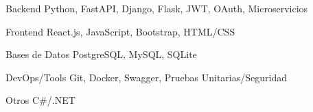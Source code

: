 
\begin{cvskills}
  \cvskill
    {Backend} %
    {Python, FastAPI, Django, Flask, JWT, OAuth, Microservicios} %

  \cvskill
    {Frontend} %
    {React.js, JavaScript, Bootstrap, HTML/CSS} %
  
  \cvskill
    {Bases de Datos} %
    {PostgreSQL, MySQL, SQLite} %

  \cvskill
    {DevOps/Tools} %
    {Git, Docker, Swagger, Pruebas Unitarias/Seguridad} %

  \cvskill
    {Otros} %
    {C\#/.NET } %
\end{cvskills}
